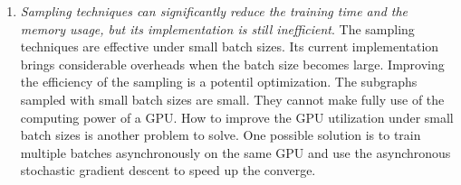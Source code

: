 \begin{enumerate}
    \item \emph{Sampling techniques can significantly reduce the training time and the memory usage, but its implementation is still inefficient}.
          The sampling techniques are effective under small batch sizes.
          Its current implementation brings considerable overheads when the batch size becomes large.
          Improving the efficiency of the sampling is a potentil optimization.
          The subgraphs sampled with small batch sizes are small.
          They cannot make fully use of the computing power of a GPU.
          How to improve the GPU utilization under small batch sizes is another problem to solve.
          One possible solution is to train multiple batches asynchronously on the same GPU and use the asynchronous stochastic gradient descent to speed up the converge.

\end{enumerate}
